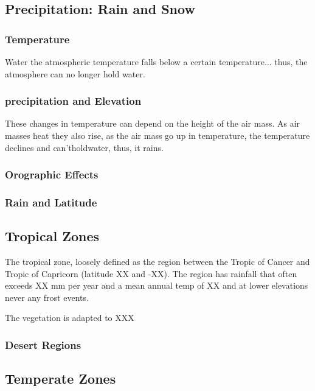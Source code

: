 \subsection{Precipitation: Rain and Snow}

\subsubsection{Temperature}

Water the atmospheric temperature falls below a certain temperature... 
thus, the atmosphere can no longer hold water. 

\subsubsection{precipitation and Elevation}

These changes in temperature can depend on the height of the air mass. As air masses heat they also rise, as the air mass go up in temperature, the temperature declines and can'tholdwater, thus, it rains.


\subsubsection{Orographic Effects}

\subsubsection{Rain and Latitude}


\subsection{Tropical Zones}

The tropical zone, loosely defined as the region between the Tropic of Cancer and Tropic of Capricorn (latitude XX and -XX). The region has rainfall that often exceeds XX mm per year and a mean annual temp of XX and at lower elevations never any frost events. 

The vegetation is adapted to XXX 

\subsubsection{Desert Regions}

\subsection{Temperate Zones}


